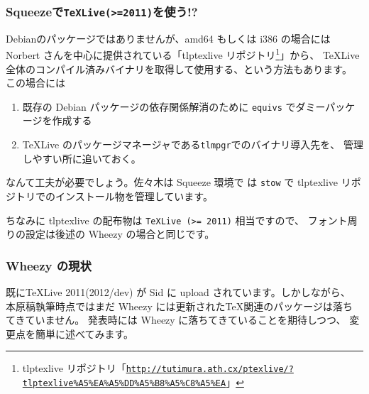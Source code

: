 \documentclass[mingoth,a4paper]{jsarticle}
\begin{document}
\subsubsection{Squeezeで{\tt{{\TeX}Live(>=2011)}}を使う!?}

Debianのパッケージではありませんが、amd64 もしくは i386 の場合には
Norbert さんを中心に提供されている「tlptexlive リポジトリ\footnote{
  tlptexlive リポジトリ「{\tt{\url{http://tutimura.ath.cx/ptexlive/?tlptexlive\%A5\%EA\%A5\%DD\%A5\%B8\%A5\%C8\%A5\%EA}}}」
}」から、
TeXLive 全体のコンパイル済みバイナリを取得して使用する、という方法もあります。
%
この場合には
\begin{enumerate}
\item 既存の Debian パッケージの依存関係解消のために {\tt{equivs}} でダミーパッケージを作成する
\item {\TeX}Live のパッケージマネージャである{\tt{tlmpgr}}でのバイナリ導入先を、
  管理しやすい所に追いておく。
\end{enumerate}
なんて工夫が必要でしょう。佐々木は Squeeze 環境で
は {\tt{stow}} で tlptexlive リポジトリでのインストール物を管理しています。

ちなみに tlptexlive の配布物は {\tt{{\TeX}Live (>= 2011)}} 相当ですので、
フォント周りの設定は後述の Wheezy の場合と同じです。

\subsubsection{Wheezy の現状}

既に{\TeX}Live 2011(2012/dev) が Sid に upload されています。しかしながら、
本原稿執筆時点ではまだ Wheezy には更新された{\TeX}関連のパッケージは落ち
てきていません。
発表時には Wheezy に落ちてきていることを期待しつつ、
変更点を簡単に述べてみます。
\end{document}
